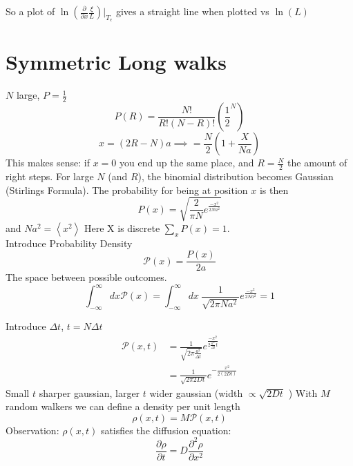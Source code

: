 \documentclass[11pt]{book}
\theoremstyle{definition}
\begin{document}
So a plot of $ \ln(\frac{\partial }{\partial x} \frac{\xi}{L} )|_{T_c}  $ gives a straight line when plotted vs $ \ln(L)  $ 

\section{Symmetric Long walks}
$ N $ large, $ P= \frac{1}{2} $ 
\[ P(R) = \frac{N!}{R!(N-R)!} ( \frac{1}{2}^N ) \] 
\[ x = (2R-N)a \implies = \frac{N}{2}(1+\frac{X}{Na})\] 
This makes sense: if $ x=0 $ you end up the same place, and $ R = \frac{N}{2} $ the amount of right steps.
For large $ N $ (and $ R $), the binomial distribution becomes Gaussian (Stirlings Formula).
The probability for being at position $ x $ is then
\[ P(x) = \sqrt{\frac{2}{\pi N} e^{\frac{-x^2}{2Na^2}}} \] 
and $ Na^2 = \left \langle x^2 \right \rangle $ 
Here X is discrete $ \sum_{x} P(x)=1 $. \\

Introduce Probability Density
\begin{equation}
	\mathcal{P}(x) = \frac{P(x)}{2a}
\end{equation}
The space between possible outcomes.
\[ \int_{-\infty}^{\infty} dx \mathcal{P}(x) = \int_{{-\infty}}^{{\infty}} {dx} \: {\frac{1}{\sqrt{2\pi Na^2}}} {e^{\frac{-x^2}{2Na^2}}} = 1
 \] 

Introduce $ \Delta t $, $ t = N \Delta t $ 
\[ 
\begin{aligned}
\mathcal{P}(x,t) &= \frac{1}{\sqrt{2\pi \frac{a^2}{\Delta t}}} e^{\frac{-x^2}{2 \frac{a^2}{\Delta t}t}} \\
		 &= \frac{1}{\sqrt{2\pi 2 D t}}e^{-\frac{x^2}{2(2Dt)}} 
\end{aligned}
\]
Small $ t $ sharper gaussian, larger $ t $ wider gaussian (width $ \propto \sqrt{2Dt} $ )
With $ M $ random walkers we can define a density per unit length
\begin{equation}
	\rho(x,t) = M\mathcal{P}(x,t)
\end{equation}
Observation: $ \rho(x,t) $ satisfies the diffusion equation:
\[ \frac{\partial \rho}{\partial t} = D \frac{\partial ^2\rho}{\partial x^2} \] 
\end{document}
